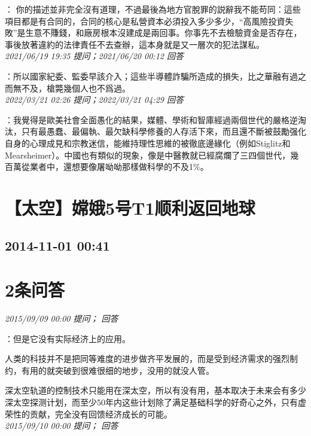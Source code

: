 \documentclass[twocolumn]{ctexart}
\begin{document}
：
你的描述並非完全沒有道理，不過最後為地方官脫罪的説辭我不能苟同：這些項目都是有合同的，合同的核心是私營資本必須投入多少多少，“高風險投資失敗”是生意不賺錢，和廠房根本沒建成是兩回事。你事先不去檢驗資金是否存在，事後放著違約的法律責任不去查辦，這本身就是又一層次的犯法謀私。
\\

\textit{\hfill\noindent\small 2021/06/19 19:35 提问；2021/06/20 00:12 回答}

：所以國家紀委、監委早該介入；這些半導體詐騙所造成的損失，比之華融有過之而無不及，槍斃幾個人也不爲過。
\\

\textit{\hfill\noindent\small 2022/03/21 02:26 提问；2022/03/21 04:29 回答}

：我覺得是歐美社會全面愚化的結果，媒體、學術和智庫經過兩個世代的嚴格逆淘汰，只有最愚蠢、最偏執、最欠缺科學修養的人存活下來，而且還不斷被鼓勵强化自身的心理成見和宗教迷信，能維持理性思維的被徹底邊緣化（例如Stiglitz和Mearsheimer）。中國也有類似的現象，像是中醫教就已經腐爛了三四個世代，幾百萬從業者中，還想要像屠呦呦那樣做科學的不及1\%。
\\


\section{【太空】嫦娥5号T1顺利返回地球}
\subsection{2014-11-01 00:41}


\section{2条问答}

\textit{\hfill\noindent\small 2015/09/09 00:00 提问； 回答}

：但是它没有实际经济上的应用。

人类的科技并不是把同等难度的进步做齐平发展的，而是受到经济需求的强烈制约，有用的就突破到很难很细的地步，没用的就没人管。

深太空轨道的控制技术只能用在深太空，所以有没有用，基本取决于未来会有多少深太空探测计划，而至少50年内这些计划除了满足基础科学的好奇心之外，只有虚荣性的贡献，完全没有回馈经济成长的可能。\\

\textit{\hfill\noindent\small 2015/09/10 00:00 提问； 回答}
\end{document}
